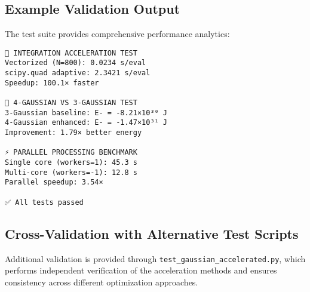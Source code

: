 \documentclass[12pt,a4paper]{article}
\begin{document}
\subsection{Example Validation Output}

The test suite provides comprehensive performance analytics:

\begin{verbatim}
🔬 INTEGRATION ACCELERATION TEST
Vectorized (N=800): 0.0234 s/eval
scipy.quad adaptive: 2.3421 s/eval
Speedup: 100.1× faster

🧬 4-GAUSSIAN VS 3-GAUSSIAN TEST  
3-Gaussian baseline: E- = -8.21×10³⁰ J
4-Gaussian enhanced: E- = -1.47×10³¹ J
Improvement: 1.79× better energy

⚡ PARALLEL PROCESSING BENCHMARK
Single core (workers=1): 45.3 s
Multi-core (workers=-1): 12.8 s  
Parallel speedup: 3.54×

✅ All tests passed
\end{verbatim}

\subsection{Cross-Validation with Alternative Test Scripts}

Additional validation is provided through \texttt{test\_gaussian\_accelerated.py}, which performs independent verification of the acceleration methods and ensures consistency across different optimization approaches.
\end{document}
